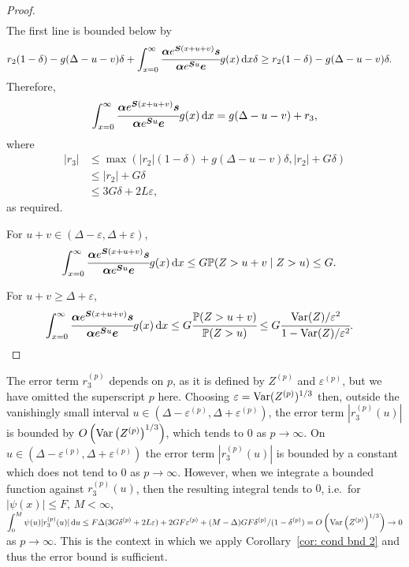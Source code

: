 \begin{proof}
\begin{align*}
	\end{align*}
	The first line is bounded below by 
	\begin{align*}
		r_2 (1-\delta ) - g(\Delta-u-v)\delta +\int_{x=0}^\infty \cfrac{\boldsymbol \alpha  e^{\boldsymbol{S} (x+u+v)} \boldsymbol s}{\boldsymbol \alpha  e^{\boldsymbol{S} u} \boldsymbol e} g(x)\, \mathrm{d} x\delta 
		&\geq r_2(1-\delta ) - g(\Delta-u-v)\delta .
	\end{align*}
	Therefore, 
	\begin{align}
		\int_{x=0}^\infty \cfrac{\boldsymbol \alpha  e^{\boldsymbol{S} (x+u+v)} \boldsymbol s}{\boldsymbol \alpha  e^{\boldsymbol{S} u} \boldsymbol e} g(x)\, \mathrm{d} x  = g(\Delta-u-v) + r_3 ,
	\end{align}
	where 
	\begin{align}
		\nonumber\left|r_3 \right| 
		&\leq \max\left(|r_2|(1-\delta ) + g(\Delta-u-v)\delta , |r_2| + G \delta \right) 
		\\\nonumber&\leq  |r_2| + G\delta
		\\&\leq 3G\delta + 2L\varepsilon,
	\end{align}
	as required. 
	
	For \(u+v\in (\Delta-\varepsilon, \Delta + \varepsilon)\),
	\begin{align}
		\int_{x=0}^\infty \cfrac{\boldsymbol \alpha  e^{\boldsymbol{S} (x+u+v)} \boldsymbol s}{\boldsymbol \alpha  e^{\boldsymbol{S} u} \boldsymbol e} g(x)\, \mathrm{d} x & \leq G \mathbb P(Z>u+v\mid Z>u) \leq G.
	\end{align}
	
	For \(u+v \geq \Delta + \varepsilon\),
	\begin{align}
		\int_{x=0}^\infty \cfrac{\boldsymbol \alpha  e^{\boldsymbol{S} (x+u+v)} \boldsymbol s}{\boldsymbol \alpha  e^{\boldsymbol{S} u} \boldsymbol e} g(x)\, \mathrm{d} x & \leq G \cfrac{\mathbb P(Z>u+v)}{\mathbb P( Z>u)} 
		 \leq G\cfrac{\mathrm{Var}(Z)/\varepsilon^2}{1-\mathrm{Var}(Z)/\varepsilon^2} .
	\end{align}
\end{proof}

The error term \(r_3^{(p)}\) depends on \(p\), as it is defined by \(Z^{(p)}\) and \(\varepsilon^{(p)}\), but we have omitted the superscript \(p\) here. Choosing \(\varepsilon=\mathrm{Var}(Z^{(p)})^{1/3}\) then, outside the vanishingly small interval \(u\in(\Delta-\varepsilon^{(p)},\Delta+\varepsilon^{(p)})\), the error term \(|r_3^{(p)}(u)|\) is bounded by \(O\left(\mathrm{Var}\left(Z^{(p)}\right)^{1/3}\right)\), which tends to 0 as \(p\to\infty\). On \(u\in(\Delta-\varepsilon^{(p)},\Delta+\varepsilon^{(p)})\) the error term \(|r_3^{(p)}(u)|\) is bounded by a constant which does not tend to \(0\) as \(p \to \infty\). However, when we integrate a bounded function against \(r_3^{(p)}(u)\), then the resulting integral tends to \(0\), i.e.~for \(|\psi(x)|\leq F, \, M<\infty\), \(\displaystyle \int_{0}^M \psi(u) |r_3^{(p)}(u)|\, \mathrm{d} u\leq F\Delta (3G\delta^{(p)}+2L\varepsilon) + 2GF\varepsilon^{(p)} + (M-\Delta)GF{\delta^{(p)}}/({1-\delta^{(p)}})=O\left(\mathrm{Var}\left(Z^{(p)}\right)^{1/3}\right)\to 0 \) as \(p\to\infty\). This is the context in which we apply Corollary~\ref{cor: cond bnd 2} and thus the error bound is sufficient. 

